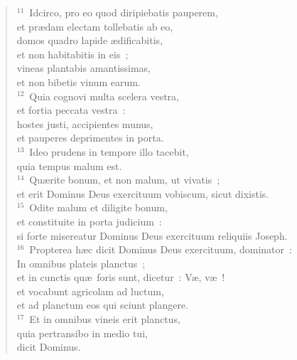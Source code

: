 \begin{verse}
${}^{11}$~Idcirco, pro eo quod diripiebatis pauperem,\\ et pr\ae dam electam tollebatis ab eo,\\ domos quadro lapide \ae dificabitis,\\ et non habitabitis in eis~;\\ vineas plantabis amantissimas,\\ et non bibetis vinum earum.\\
${}^{12}$~Quia cognovi multa scelera vestra,\\ et fortia peccata vestra~:\\ hostes justi, accipientes munus,\\ et pauperes deprimentes in porta.\\
${}^{13}$~Ideo prudens in tempore illo tacebit,\\ quia tempus malum est.\\
${}^{14}$~Qu\ae rite bonum, et non malum, ut vivatis~;\\ et erit Dominus Deus exercituum vobiscum, sicut dixistis.\\
${}^{15}$~Odite malum et diligite bonum,\\ et constituite in porta judicium~:\\ si forte misereatur Dominus Deus exercituum reliquiis Joseph.\\
${}^{16}$~Propterea h\ae c dicit Dominus Deus exercituum, dominator~:\\ In omnibus plateis planctus~;\\ et in cunctis qu\ae\ foris sunt, dicetur~: V\ae , v\ae~!\\ et vocabunt agricolam ad luctum,\\ et ad planctum eos qui sciunt plangere.\\
${}^{17}$~Et in omnibus vineis erit planctus,\\ quia pertransibo in medio tui,\\ dicit Dominus.\end{verse}


